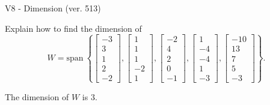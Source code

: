 \begin{exercise}
  \begin{exerciseTitle}V8 - Dimension (ver. 513)\end{exerciseTitle}
  \begin{exerciseStatement}
    Explain how to find the dimension of 
\[W=\mathrm{span}\ \left\{\left[\begin{array}{r}
-3 \\
3 \\
1 \\
2 \\
-2
\end{array}\right] , \left[\begin{array}{r}
1 \\
1 \\
1 \\
-2 \\
1
\end{array}\right] , \left[\begin{array}{r}
-2 \\
4 \\
2 \\
0 \\
-1
\end{array}\right] , \left[\begin{array}{r}
1 \\
-4 \\
-4 \\
1 \\
-3
\end{array}\right] , \left[\begin{array}{r}
-10 \\
13 \\
7 \\
5 \\
-3
\end{array}\right]\right\}.\]



  \end{exerciseStatement}
  \begin{exerciseAnswer}
   The dimension of \(W\) is  \(3\).
  


  \end{exerciseAnswer}
\end{exercise}